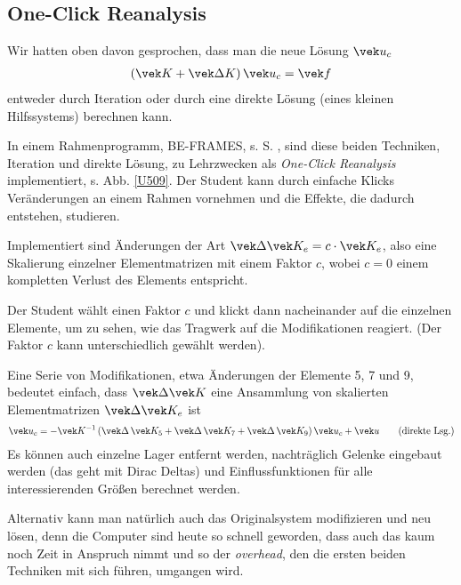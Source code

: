 {{%
\textcolor{chapterTitleBlue}{\section{One-Click Reanalysis}}
Wir hatten oben davon gesprochen, dass man die neue L\"{o}sung $\vek u_c$
\begin{align}
(\vek K + \vek \Delta K)\,\vek u_c = \vek f
\end{align}
entweder durch Iteration oder durch eine direkte L\"{o}sung (eines kleinen Hilfssystems) berechnen kann.

In einem Rahmenprogramm, BE-FRAMES, s. S. \pageref{SoftwareDownload}, sind diese beiden Techniken, Iteration und direkte L\"{o}sung, zu Lehrzwecken als {\em One-Click Reanalysis\/} implementiert, s. Abb. \ref{U509}. Der Student kann durch einfache Klicks Ver\"{a}nderungen an einem Rahmen vornehmen und die Effekte, die dadurch entstehen, studieren.

Implementiert sind \"{A}nderungen der Art $\vek \Delta \vek K_e = c \cdot \vek K_e$,
also eine Skalierung einzelner Elementmatrizen mit einem Faktor $c$, wobei $c = 0$ einem kompletten Verlust des Elements entspricht.

Der Student w\"{a}hlt einen Faktor $c$ und klickt dann nacheinander auf die einzelnen Elemente, um zu sehen, wie das Tragwerk auf die Modifikationen reagiert. (Der Faktor $c$ kann unterschiedlich gew\"{a}hlt werden).

Eine Serie von Modifikationen, etwa \"{A}nderungen der Elemente  5, 7 und 9, bedeutet einfach, dass $\vek \Delta \vek K$ eine Ansammlung von skalierten Elementmatrizen $\vek \Delta \vek K_e$ ist
\begin{align}
\vek u_c = - \vek K^{-1}\,(\vek \Delta\,\vek K_5 + \vek \Delta\,\vek K_7 + \vek \Delta\,\vek K_9 )\,\vek u_c + \vek u \qquad \text{(direkte Lsg.)}
\end{align}
Es k\"{o}nnen auch einzelne Lager entfernt werden, nachtr\"{a}glich Gelenke eingebaut werden (das geht mit Dirac Deltas) und Einflussfunktionen f\"{u}r alle interessierenden Gr\"{o}{\ss}en berechnet werden.

Alternativ kann man nat\"{u}rlich auch das Originalsystem modifizieren und neu l\"{o}sen, denn die Computer sind heute so schnell geworden, dass auch das kaum noch Zeit in Anspruch nimmt und so der {\em overhead\/}, den die ersten beiden Techniken mit sich f\"{u}hren, umgangen wird.

}}
